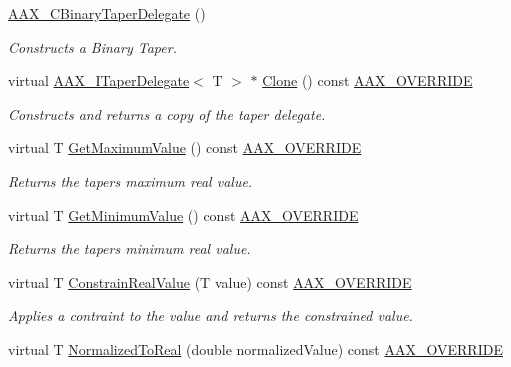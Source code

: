 \begin{DoxyCompactItemize}
\item 
\hyperlink{a00013_aae24e1f477f843ddb351838931a3e6b5}{A\+A\+X\+\_\+\+C\+Binary\+Taper\+Delegate} ()
\begin{DoxyCompactList}\small\item\em Constructs a Binary Taper. \end{DoxyCompactList}\item 
virtual \hyperlink{a00114}{A\+A\+X\+\_\+\+I\+Taper\+Delegate}$<$ T $>$ $\ast$ \hyperlink{a00013_a433b33f4b290fe03846b2044014ae994}{Clone} () const \hyperlink{a00149_ac2f24a5172689ae684344abdcce55463}{A\+A\+X\+\_\+\+O\+V\+E\+R\+R\+I\+D\+E}
\begin{DoxyCompactList}\small\item\em Constructs and returns a copy of the taper delegate. \end{DoxyCompactList}\item 
virtual T \hyperlink{a00013_a1abc18860a0c404676c52d8d1d8b7724}{Get\+Maximum\+Value} () const \hyperlink{a00149_ac2f24a5172689ae684344abdcce55463}{A\+A\+X\+\_\+\+O\+V\+E\+R\+R\+I\+D\+E}
\begin{DoxyCompactList}\small\item\em Returns the taper\textquotesingle{}s maximum real value. \end{DoxyCompactList}\item 
virtual T \hyperlink{a00013_af4c360e6bef8fc945d838715c5f965c7}{Get\+Minimum\+Value} () const \hyperlink{a00149_ac2f24a5172689ae684344abdcce55463}{A\+A\+X\+\_\+\+O\+V\+E\+R\+R\+I\+D\+E}
\begin{DoxyCompactList}\small\item\em Returns the taper\textquotesingle{}s minimum real value. \end{DoxyCompactList}\item 
virtual T \hyperlink{a00013_a91622c9c4cfaaf3b08e39095a26d182a}{Constrain\+Real\+Value} (T value) const \hyperlink{a00149_ac2f24a5172689ae684344abdcce55463}{A\+A\+X\+\_\+\+O\+V\+E\+R\+R\+I\+D\+E}
\begin{DoxyCompactList}\small\item\em Applies a contraint to the value and returns the constrained value. \end{DoxyCompactList}\item 
virtual T \hyperlink{a00013_ac50e2d93aeacf6a0293eb0098c8258ba}{Normalized\+To\+Real} (double normalized\+Value) const \hyperlink{a00149_ac2f24a5172689ae684344abdcce55463}{A\+A\+X\+\_\+\+O\+V\+E\+R\+R\+I\+D\+E}

\end{DoxyCompactItemize}
